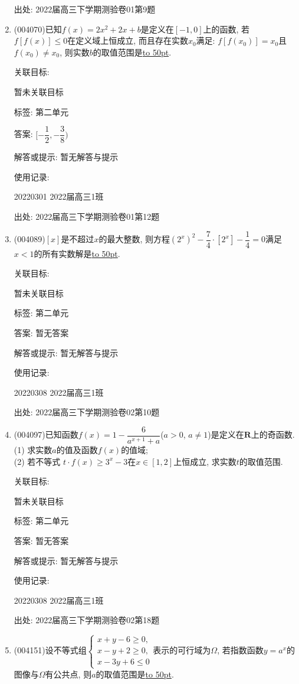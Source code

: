 \documentclass[10pt,a4paper]{article}
\newcommand{\blank}[1]{\underline{\hbox to #1pt{}}}
\begin{document}
\begin{enumerate}[1.]
出处: 2022届高三下学期测验卷01第9题
\item { (004070)}已知$f(x)=2x^2+2x+b$是定义在$[-1,0]$上的函数, 若$f[f(x)]\le 0$在定义域上恒成立, 而且存在实数$x_0$满足: $f[f(x_0)]=x_0$且$f(x_0)\ne x_0$, 则实数$b$的取值范围是\blank{50}.


关联目标:

暂未关联目标



标签: 第二单元

答案: $[-\dfrac12,-\dfrac 38)$

解答或提示: 暂无解答与提示

使用记录:

20220301	2022届高三1班	


出处: 2022届高三下学期测验卷01第12题
\item { (004089)}$[x]$是不超过$x$的最大整数, 则方程$(2^x)^2-\dfrac 74\cdot [2^x]-\dfrac 14=0$满足$x<1$的所有实数解是\blank{50}.


关联目标:

暂未关联目标



标签: 第二单元

答案: 暂无答案

解答或提示: 暂无解答与提示

使用记录:

20220308	2022届高三1班	


出处: 2022届高三下学期测验卷02第10题
\item { (004097)}已知函数$f(x)=1-\dfrac 6{a^{x+1}+a}$($a>0$, $a\ne 1$)是定义在$\mathbf{R}$上的奇函数.\\
(1) 求实数$a$的值及函数$f(x)$的值域;\\
(2) 若不等式 $t\cdot f(x)\ge 3^x-3$在$x\in [1,2]$上恒成立, 求实数$t$的取值范围.


关联目标:

暂未关联目标



标签: 第二单元

答案: 暂无答案

解答或提示: 暂无解答与提示

使用记录:

20220308	2022届高三1班		


出处: 2022届高三下学期测验卷02第18题
\item { (004151)}设不等式组$\begin{cases} x+y-6\ge 0, \\ x-y+2\ge 0, \\ x-3y+6\le 0 \end{cases}$表示的可行域为$\Omega$, 若指数函数$y=a^x$的图像与$\Omega$有公共点, 则$a$的取值范围是\blank{50}.



\end{enumerate}
\end{document}
